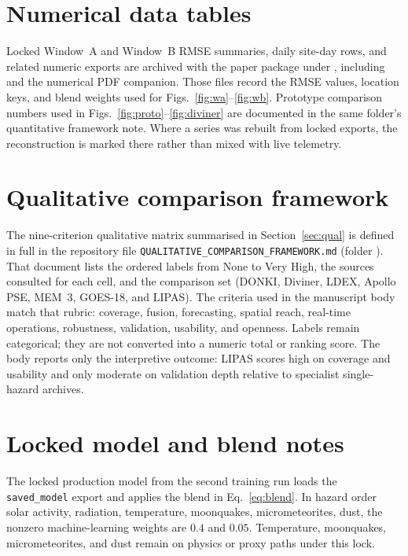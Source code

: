 \appendix

\section{Numerical data tables}
\label{app:A}

Locked Window~A and Window~B RMSE summaries, daily site-day rows, and related numeric exports are archived with the paper package under , including  and the numerical PDF companion. Those files record the RMSE values, location keys, and blend weights used for Figs.~\ref{fig:wa}--\ref{fig:wb}. Prototype comparison numbers used in Figs.~\ref{fig:proto}--\ref{fig:diviner} are documented in the same folder's quantitative framework note. Where a series was rebuilt from locked exports, the reconstruction is marked there rather than mixed with live telemetry.

\section{Qualitative comparison framework}
\label{app:B}

\begin{sloppypar}
The nine-criterion qualitative matrix summarised in Section~\ref{sec:qual} is defined in full in the repository file \texttt{QUALITATIVE\_COMPARISON\_FRAMEWORK.md} (folder ).
That document lists the ordered labels from None to Very High, the sources consulted for each cell, and the comparison set (DONKI, Diviner, LDEX, Apollo PSE, MEM~3, GOES-18, and LIPAS).
The criteria used in the manuscript body match that rubric: coverage, fusion, forecasting, spatial reach, real-time operations, robustness, validation, usability, and openness.
Labels remain categorical; they are not converted into a numeric total or ranking score.
The body reports only the interpretive outcome: LIPAS scores high on coverage and usability and only moderate on validation depth relative to specialist single-hazard archives.
\end{sloppypar}

\section{Locked model and blend notes}
\label{app:C}

The locked production model from the second training run loads the \texttt{saved\_model} export and applies the blend in Eq.~\eqref{eq:blend}. In hazard order solar activity, radiation, temperature, moonquakes, micrometeorites, dust, the nonzero machine-learning weights are $0.4$ and $0.05$. Temperature, moonquakes, micrometeorites, and dust remain on physics or proxy paths under this lock.

